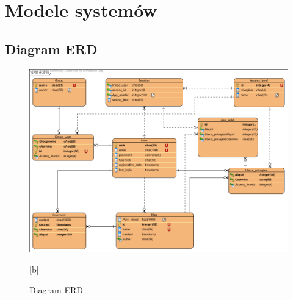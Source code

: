 \chapter{Modele systemów}
\section{Diagram ERD}

\begin{figure}[ht]

\includegraphics[scale=0.85,angle=270]{img/ERDJava.png}
\caption{Diagram ERD}[b]
\end{figure}